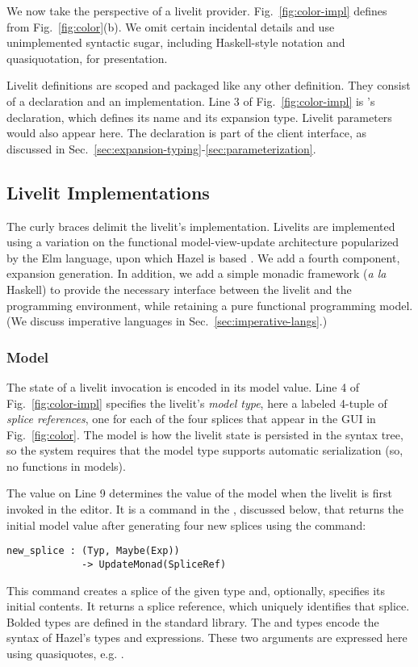 \noindent
We now take the perspective of a livelit provider.
Fig.~\ref{fig:color-impl}
defines  from Fig.~\ref{fig:color}(b). We omit certain 
incidental details and use unimplemented syntactic sugar, including
Haskell-style  notation and quasiquotation, for presentation.

Livelit definitions are scoped and packaged like 
any other definition. They consist of a declaration and an implementation. 
Line 3 of Fig.~\ref{fig:color-impl} is 's declaration,
which defines its name and its {expansion type}. 
Livelit parameters would also appear here. 
The declaration is part of the client interface, 
as discussed in Sec.~\ref{sec:expansion-typing}-\ref{sec:parameterization}. 

\subsection{Livelit Implementations}
The curly braces delimit the livelit's implementation. 
Livelits are implemented using a variation on the functional model-view-update
architecture popularized by the Elm language, upon which Hazel is based \cite{ElmArchitecture}. We add a fourth component,
expansion generation. In addition, we add a simple monadic framework (\emph{a la} Haskell) to provide the necessary  
interface between the livelit and the programming environment, while retaining
a pure functional programming model. (We discuss imperative languages in Sec.~\ref{sec:imperative-langs}.)


\subsubsection{Model}\label{sec:model}
The state of a livelit invocation is encoded in its model value. 
Line 4 of Fig.~\ref{fig:color-impl} specifies the livelit's \emph{model type},
here a labeled 4-tuple of \emph{splice references}, one for each of the four splices
that appear in the GUI in Fig.~\ref{fig:color}.
The model is how the livelit state is persisted in the syntax tree, so 
 the system requires that the model type supports automatic serialization
 (so, no functions in models).

The  value on Line 9 determines the value of the model
when the livelit is first invoked in the editor.
It is a command in the , discussed below, that returns the 
initial model value after generating four new splices 
using the  command:
\begin{lstlisting}[numbers=none]
new_splice : (Typ, Maybe(Exp)) 
             -> UpdateMonad(SpliceRef)
\end{lstlisting}
This command creates a splice
of the given type and, optionally, specifies its initial contents. 
It returns a splice reference, which uniquely identifies that splice.
Bolded types  
are defined in the standard library. The  and  types 
encode the syntax of Hazel's types and expressions.
These two arguments are expressed here using quasiquotes, e.g.  \cite{bawden1999quasiquotation}. 

